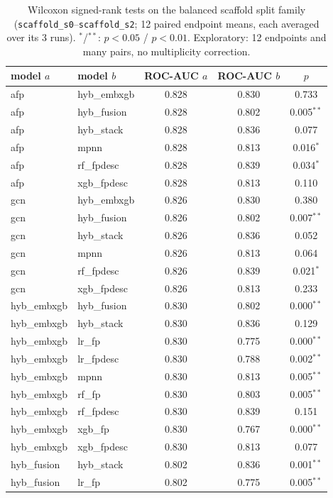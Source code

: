\begin{table}[t]
\centering
\caption{Wilcoxon signed-rank tests on the balanced scaffold split family (\texttt{scaffold\_s0}--\texttt{scaffold\_s2}; 12 paired endpoint means, each averaged over its 3 runs). $^{*}$/$^{**}$: $p<0.05$ / $p<0.01$. Exploratory: 12 endpoints and many pairs, no multiplicity correction.}
\label{tab:hybrid-wilcoxon}
\scriptsize
\begin{tabular}{llccc}
\toprule
model $a$ & model $b$ & ROC-AUC $a$ & ROC-AUC $b$ & $p$ \\
\midrule
afp & hyb\_embxgb & 0.828 & 0.830 & 0.733 \\
afp & hyb\_fusion & 0.828 & 0.802 & 0.005$^{**}$ \\
afp & hyb\_stack & 0.828 & 0.836 & 0.077 \\
afp & mpnn & 0.828 & 0.813 & 0.016$^{*}$ \\
afp & rf\_fpdesc & 0.828 & 0.839 & 0.034$^{*}$ \\
afp & xgb\_fpdesc & 0.828 & 0.813 & 0.110 \\
gcn & hyb\_embxgb & 0.826 & 0.830 & 0.380 \\
gcn & hyb\_fusion & 0.826 & 0.802 & 0.007$^{**}$ \\
gcn & hyb\_stack & 0.826 & 0.836 & 0.052 \\
gcn & mpnn & 0.826 & 0.813 & 0.064 \\
gcn & rf\_fpdesc & 0.826 & 0.839 & 0.021$^{*}$ \\
gcn & xgb\_fpdesc & 0.826 & 0.813 & 0.233 \\
hyb\_embxgb & hyb\_fusion & 0.830 & 0.802 & 0.000$^{**}$ \\
hyb\_embxgb & hyb\_stack & 0.830 & 0.836 & 0.129 \\
hyb\_embxgb & lr\_fp & 0.830 & 0.775 & 0.000$^{**}$ \\
hyb\_embxgb & lr\_fpdesc & 0.830 & 0.788 & 0.002$^{**}$ \\
hyb\_embxgb & mpnn & 0.830 & 0.813 & 0.005$^{**}$ \\
hyb\_embxgb & rf\_fp & 0.830 & 0.803 & 0.005$^{**}$ \\
hyb\_embxgb & rf\_fpdesc & 0.830 & 0.839 & 0.151 \\
hyb\_embxgb & xgb\_fp & 0.830 & 0.767 & 0.000$^{**}$ \\
hyb\_embxgb & xgb\_fpdesc & 0.830 & 0.813 & 0.077 \\
hyb\_fusion & hyb\_stack & 0.802 & 0.836 & 0.001$^{**}$ \\
hyb\_fusion & lr\_fp & 0.802 & 0.775 & 0.005$^{**}$ \\

\end{tabular}
\end{table}
